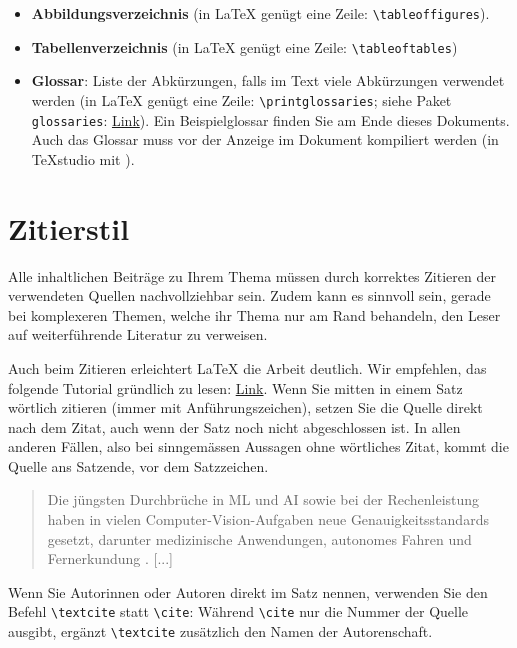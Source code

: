 \begin{itemize}
	\item \textbf{Abbildungsverzeichnis} (in \LaTeX{} genügt eine Zeile: \lstinline|\tableoffigures|).
	\item \textbf{Tabellenverzeichnis} (in \LaTeX{} genügt eine Zeile: \lstinline|\tableoftables|)
	\item \textbf{Glossar}: Liste der Abkürzungen, falls im Text viele Abkürzungen verwendet werden (in \LaTeX{} genügt eine Zeile: \lstinline|\printglossaries|; siehe Paket \lstinline|glossaries|: \href{https://www.overleaf.com/learn/latex/Glossaries}{Link}). Ein Beispielglossar finden Sie am Ende dieses Dokuments. Auch das Glossar muss vor der Anzeige im Dokument kompiliert werden (in TeXstudio mit ).

\end{itemize}


\section{Zitierstil}
Alle inhaltlichen Beiträge zu Ihrem Thema müssen durch korrektes Zitieren der verwendeten Quellen nachvollziehbar sein. Zudem kann es  sinnvoll sein, gerade bei komplexeren Themen, welche ihr Thema nur am Rand behandeln, den Leser auf weiterführende Literatur zu verweisen.

Auch beim Zitieren erleichtert \LaTeX{} die Arbeit deutlich. Wir empfehlen, das folgende Tutorial gründlich zu lesen: \href{https://de.overleaf.com/learn/latex/Bibliography_management_with_biblatex}{Link}. Wenn Sie mitten in einem Satz wörtlich zitieren (immer mit Anführungszeichen), setzen Sie die Quelle direkt nach dem Zitat, auch wenn der Satz noch nicht abgeschlossen ist. In allen anderen Fällen, also bei sinngemässen Aussagen ohne wörtliches Zitat, kommt die Quelle ans Satzende, vor dem Satzzeichen.

\begin{tcolorbox}[title=Beispiel]
	\begin{quotation}
		Die jüngsten Durchbrüche in \gls{ML} und \gls{AI} sowie bei der Rechenleistung haben in vielen Computer-Vision-Aufgaben neue Genauigkeitsstandards gesetzt, darunter medizinische Anwendungen, autonomes Fahren und Fernerkundung \cite{Volpi2017DenseSL, kampffmeyer, Zhu2017DeepLI, Shelhamer2015FullyCN}. [...]
	\end{quotation}

\end{tcolorbox}

Wenn Sie Autorinnen oder Autoren direkt im Satz nennen, verwenden Sie den Befehl \lstinline|\textcite| statt \lstinline|\cite|: Während \lstinline|\cite| nur die Nummer der Quelle ausgibt, ergänzt \lstinline|\textcite| zusätzlich den Namen der Autorenschaft.

